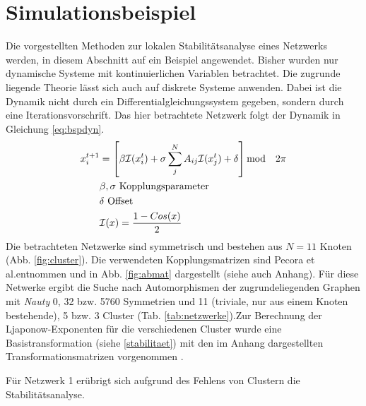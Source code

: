 \section{Simulationsbeispiel}
Die vorgestellten Methoden zur lokalen Stabilitätsanalyse eines Netzwerks werden, in diesem Abschnitt auf ein Beispiel angewendet. Bisher wurden nur dynamische Systeme mit kontinuierlichen Variablen betrachtet. Die zugrunde liegende Theorie lässt sich auch auf diskrete Systeme anwenden. Dabei ist die Dynamik nicht durch ein Differentialgleichungssystem gegeben, sondern durch eine Iterationsvorschrift. Das hier betrachtete Netzwerk  folgt der Dynamik in Gleichung \ref{eq:bspdyn}\cite{pecora2014}.
\begin{align}
\label{eq:bspdyn}
	x_i^{t+1}&=\left[\beta\mathcal{I}(x_i^t)+\sigma \sum_j^N A_{ij}\mathcal{I}(x_j^t)+\delta\right] \text{mod}\quad 2\pi
	\\\notag & \beta,\sigma \text{ Kopplungsparameter}
	\\\notag  & \delta \text{ Offset}
	\\\notag &\mathcal{I}(x)=\frac{1-Cos(x)}{2}
\end{align}
Die betrachteten Netzwerke sind symmetrisch und bestehen aus $N=11$ Knoten  (Abb. \ref{fig:cluster}). Die verwendeten Kopplungsmatrizen sind Pecora et al.entnommen und in Abb. \ref{fig:abmat} dargestellt (siehe auch Anhang)\cite{pecora2014}. Für diese Netwerke ergibt die Suche nach Automorphismen der zugrundeliegenden Graphen mit \textit{Nauty} 0, 32 bzw. 5760 Symmetrien und 11 (triviale, nur aus einem Knoten bestehende), 5 bzw. 3 Cluster (Tab. \ref{tab:netzwerke}).Zur Berechnung der Ljaponow-Exponenten für die verschiedenen Cluster wurde eine Basistransformation (siehe \ref{stabilitaet}) mit den im Anhang dargestellten Transformationsmatrizen vorgenommen \cite{pecora2014,sagenotebook}.

Für Netzwerk 1 erübrigt sich aufgrund des Fehlens von Clustern die Stabilitätsanalyse.\\


